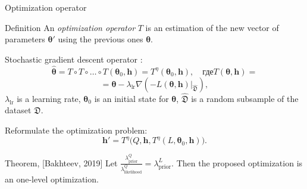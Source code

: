 \documentclass[usenames,dvipsnames,11pt,pdf,utf8,russian,aspectratio=43]{beamer}
\begin{document}
\begin{frame}{Optimization operator}
\small
\begin{block}{Definition}
An \textit{optimization operator}  $T$ is an estimation of the new vector of parameters $\boldsymbol{\theta}'$  using the previous ones $\boldsymbol{\theta}$.
\end{block}
Stochastic gradient descent operator
:\[
	 \hat{\boldsymbol{\theta}} = T \circ T \circ \dots \circ T(\boldsymbol{\theta}_0, \mathbf{h}) = T^\eta(\boldsymbol{\theta}_0, \mathbf{h}), \quad\text{где}	T(\boldsymbol{\theta}, \mathbf{h}) =
\]
\[=\boldsymbol{\theta} - \lambda_\text{lr} \nabla \left(-L(\boldsymbol{\theta}, \mathbf{h})|_{\hat{\mathfrak{D}}}\right), 
\]
$\lambda_{\text{lr}}$ is a learning rate, $\boldsymbol{\theta}_0$ is an initial state for  $\boldsymbol{\theta}$, $\hat{\mathfrak{D}}$ is a random subsample of the dataset $\mathfrak{D}$.


Reformulate the optimization problem:
\[
	 \mathbf{h}' = T^\eta\bigl(Q, \mathbf{h}, T^\eta(L, \boldsymbol{\theta}_0, \mathbf{h})\bigr).
\]


\begin{block}{Theorem, [Bakhteev, 2019]}
Let $\frac{\lambda^Q_\text{prior}}{\lambda^Q_\text{likelihood}} = {\lambda^L_\text{prior}}.$ Then the proposed optimization is an one-level optimization.
\end{block}

\end{frame}
\end{document}
